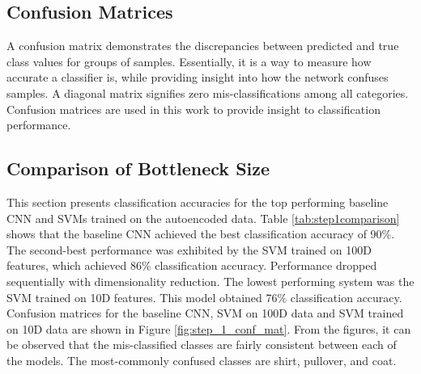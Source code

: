 \documentclass[conference]{IEEEtran}
\begin{document}
\subsection{Confusion Matrices}

A confusion matrix demonstrates the discrepancies between predicted and true class values for groups of samples.  Essentially, it is a way to measure how accurate a classifier is, while providing insight into how the network confuses samples.  A diagonal matrix signifies zero mis-classifications among all categories.  Confusion matrices are used in this work to provide insight to classification performance.

\subsection{Comparison of Bottleneck Size} \label{classification_accuracy}
This section presents classification accuracies for the top performing baseline CNN and SVMs trained on the autoencoded data.  Table \ref{tab:step1comparison} shows that the baseline CNN achieved the best classification accuracy of 90\%.  The second-best performance was exhibited by the SVM trained on 100D features, which achieved 86\% classification accuracy.  Performance dropped sequentially with dimensionality reduction.  The lowest performing system was the SVM trained on 10D features.  This model obtained 76\% classification accuracy.  Confusion matrices for the baseline CNN, SVM on 100D data and SVM trained on 10D data are shown in Figure \ref{fig:step_1_conf_mat}.
From the figures, it can be observed that the mis-classified classes are fairly consistent between each of the models.  The most-commonly confused classes are shirt, pullover, and coat.

\begin{figure*}[h!]%
	\centering
	\caption{Confusion matrix for the baseline CNN (a), SVM trained on data passed through an encoder network with bottleneck dimensionality 100 (b) and SVM trained on data passed through an encoder network with bottleneck dimensionality 10 (c).  The CNN model classified 90\% of the test data correctly while the SVM 100D model classified 86\% correctly and the  SVM 10D classified 76\% correctly.}%
	\label{fig:step_1_conf_mat}%
\end{figure*}
\end{document}
